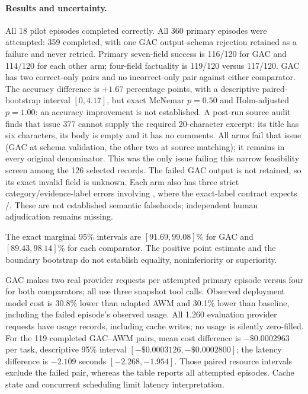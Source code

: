\paragraph{Results and uncertainty.}
All 18 pilot episodes completed correctly. All 360 primary episodes were
attempted: 359 completed, with one GAC output-schema rejection retained as a
failure and never retried. Primary seven-field success is 116/120 for GAC and
114/120 for each other arm; four-field factuality is 119/120 versus 117/120.
GAC has two correct-only pairs and no incorrect-only pair against either
comparator. The accuracy difference is $+1.67$ percentage points, with a
descriptive paired-bootstrap interval $[0,4.17]$, but exact McNemar $p=0.50$
and Holm-adjusted $p=1.00$: an accuracy improvement is not established.
A post-run source audit finds that issue 377 cannot supply the required
20-character excerpt: its title has six characters, its body is empty and it
has no comments. All arms fail that issue (GAC at schema validation, the other
two at source matching); it remains in every original denominator. This was
the only issue failing this narrow feasibility screen among the 126 selected
records. The failed GAC output is not retained, so its exact invalid field is
unknown. Each arm also has three strict category/evidence-label errors involving
, where the exact-label contract expects
/. These are not established semantic falsehoods;
independent human adjudication remains missing.

The exact marginal 95\% intervals are $[91.69,99.08]\%$ for GAC and
$[89.43,98.14]\%$ for each comparator. The positive point estimate and the
boundary bootstrap do not establish equality, noninferiority or superiority.

GAC makes two real provider requests per attempted primary episode versus four
for both comparators; all use three snapshot tool calls. Observed deployment
model cost is 30.8\% lower than adapted AWM and 30.1\% lower than baseline,
including the failed episode's observed usage. All 1,260 evaluation provider
requests have usage records, including cache writes; no usage is silently
zero-filled. For the 119 completed GAC--AWM pairs, mean cost difference is
$-\$0.0002963$ per task, descriptive 95\% interval
$[-\$0.0003126,-\$0.0002800]$; the latency difference is $-2.109$ seconds
$[-2.268,-1.954]$. Those paired resource intervals exclude the failed pair,
whereas the table reports all attempted episodes. Cache state and concurrent
scheduling limit latency interpretation.

